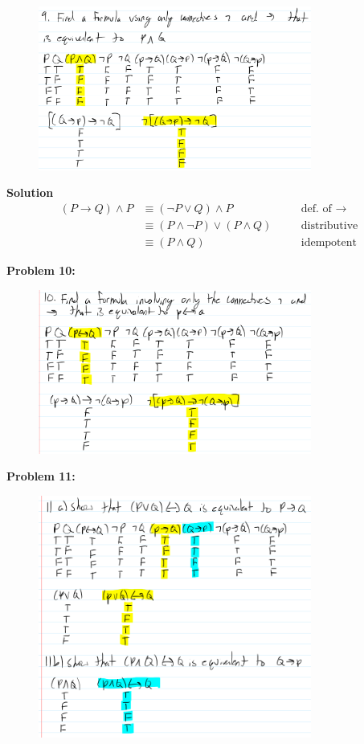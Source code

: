 \begin{figure}[H]
    \centering
    \includegraphics[width=0.8\textwidth]{images/1.2/33.PNG}
\end{figure}

\textbf{Solution}
\begin{align*}
(P \rightarrow Q) \wedge P &\equiv (\neg P \vee Q) \wedge P && \quad \text{def. of $\rightarrow$}\\
&\equiv (P \wedge \neg P) \vee (P \wedge Q) && \quad \text{distributive} \\
&\equiv (P \wedge Q) && \quad \text{idempotent}
\end{align*}

\textbf{Problem 10:}
\begin{figure}[H]
    \centering
    \includegraphics[width=0.8\textwidth]{images/1.2/34.PNG}
\end{figure}

\textbf{Problem 11:}
\begin{figure}[H]
    \centering
    \includegraphics[width=0.8\textwidth]{images/1.2/35.PNG}
\end{figure}

